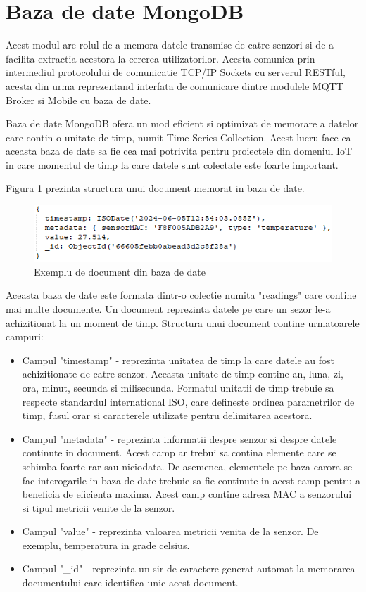 \section{Baza de date MongoDB}\label{sec:pi_bazadedate}
Acest modul are rolul de a memora datele transmise de catre senzori si de a facilita extractia acestora la cererea utilizatorilor. Acesta comunica prin intermediul 
protocolului de comunicatie TCP/IP Sockets cu serverul RESTful, acesta din urma reprezentand interfata de comunicare dintre modulele MQTT Broker si Mobile cu baza 
de date. 

Baza de date MongoDB ofera un mod eficient si optimizat de memorare a datelor care contin o unitate de timp, numit Time Series Collection. Acest lucru face ca aceasta 
baza de date sa fie cea mai potrivita pentru proiectele din domeniul IoT in care momentul de timp la care datele sunt colectate este foarte important.

Figura \ref{fig:PI_MongodbDocExample} prezinta structura unui document memorat in baza de date. 
\begin{figure}[H]
    \centering
    \includegraphics[scale=0.8]{figs/PI_MongodbDocExample.png}
    \caption{Exemplu de document din baza de date}
    \label{fig:PI_MongodbDocExample}
\end{figure}

Aceasta baza de date este formata dintr-o colectie numita "readings" care contine mai multe documente. Un document reprezinta datele pe care un sezor le-a achizitionat 
la un moment de timp. Structura unui document contine urmatoarele campuri:
\begin{itemize}
	\item Campul "timestamp" - reprezinta unitatea de timp la care datele au fost achizitionate de catre senzor. Aceasta unitate de timp contine an, luna, zi, ora, 
	minut, secunda si milisecunda. Formatul unitatii de timp trebuie sa respecte standardul international ISO, care defineste ordinea parametrilor de timp, 
    fusul orar si caracterele utilizate pentru delimitarea acestora.
	\item Campul "metadata" - reprezinta informatii despre senzor si despre datele continute in document. Acest camp ar trebui sa contina elemente care se schimba 
	foarte rar sau niciodata. De asemenea, elementele pe baza carora se fac interogarile in baza de date trebuie sa fie continute in acest camp pentru a beneficia 
    de eficienta maxima. Acest camp contine adresa MAC a senzorului si tipul metricii venite de la senzor. 
	\item Campul "value" - reprezinta valoarea metricii venita de la senzor. De exemplu, temperatura in grade celsius.
	\item Campul "\_id" - reprezinta un sir de caractere generat automat la memorarea documentului care identifica unic acest document.
\end{itemize}

